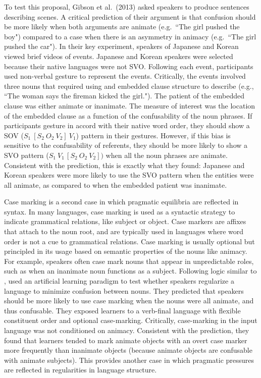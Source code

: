 \documentclass[man, noapacite, 12pt]{apa2}
\begin{document}
To test this proposal, Gibson et al.\ (2013) asked speakers to produce sentences describing scenes. A critical prediction of their argument is that confusion should be more likely when both arguments are animate (e.g.\ ``The girl pushed the boy") compared to a case when there is an asymmetry in animacy (e.g.\ ``The girl pushed the car"). In their key experiment, speakers of Japanese and Korean viewed brief videos of events. Japanese and Korean speakers were selected because their native languages were not SVO. Following each event, participants used non-verbal  gesture to represent the events. Critically, the events  involved three nouns that required using and embedded clause structure to describe (e.g., ``The woman says the fireman kicked the girl.").  The patient of the embedded clause was either animate or inanimate. The measure of interest was the location of the embedded clause as a function of the confusability of the  noun phrases. If participants gesture in accord with their native word order, they should show a SOV ($S_{1}\  [S_{2}\ O_{2}\ V_{2}]\  V_{1}$) pattern in their gestures. However, if this bias is sensitive to the confusability of  referents, they should be more likely to show a SVO pattern ($S_{1}\  V_{1\ }[S_{2}\ O_{2}\ V_{2}])$ when all the noun phrases are animate. Consistent with the prediction, this is exactly what they found: Japanese and Korean speakers were more likely to use the SVO pattern when the entities were all animate, as compared to when the embedded patient was inanimate.

Case marking is a second case in which pragmatic equilibria are reflected in syntax. In many languages, case marking is used as a syntactic strategy to indicate  grammatical relations, like subject or object. Case markers are affixes that attach to the noun root, and are typically used in languages where word order is not a cue to grammatical relations. Case marking is usually optional but principled in its usage based on semantic properties of the nouns like animacy. For example, speakers often case mark nouns that appear in unpredictable roles, such as when an inanimate noun functions as a subject. Following logic similar to  ,   used an artificial learning paradigm to test whether speakers regularize a language to minimize confusion between nouns. They predicted that speakers should be more likely to use case marking when the nouns were all animate, and thus confusable. They exposed learners to a verb-final language with flexible constituent order and optional case-marking. Critically, case-marking in the input language was not conditioned on animacy. Consistent with the prediction, they found that learners tended to mark animate objects with an overt case marker more frequently than inanimate objects (because animate objects are confusable  with animate subjects). This provides another case in which pragmatic pressures are reflected in  regularities in language structure.
\end{document}
